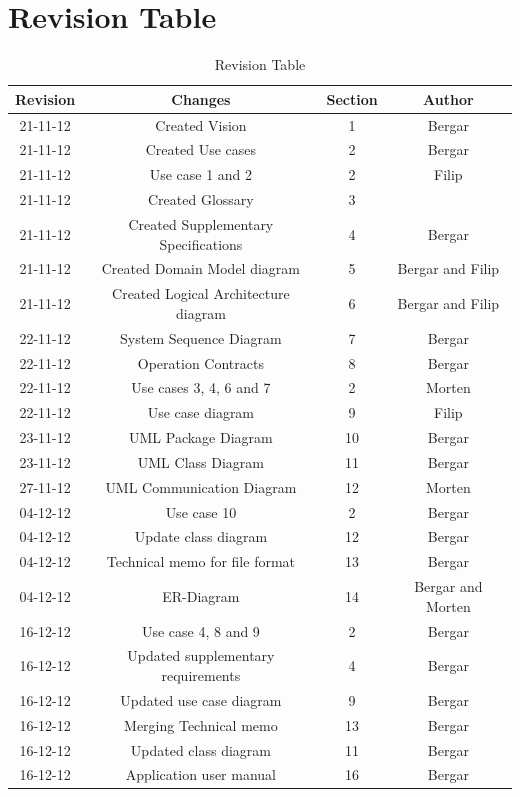 \documentclass[11pt,a4paper]{article}
\begin{document}
\section{Revision Table}
\begin{table}[h]
\caption{Revision Table}
\begin{center}
\begin{tabular}{c|c|c|c}
\hline 
Revision & Changes & Section & Author \\ \hline 
21-11-12 & Created Vision & 1 & Bergar \\ 
21-11-12 & Created Use cases & 2 & Bergar \\
21-11-12 & Use case 1 and 2 & 2 & Filip \\
21-11-12 & Created Glossary & 3 & \\
21-11-12 & Created Supplementary Specifications & 4 & Bergar \\ 
21-11-12 & Created Domain Model diagram & 5 & Bergar and Filip \\
21-11-12 & Created Logical Architecture diagram & 6 & Bergar and Filip \\
\hline 
22-11-12 & System Sequence Diagram & 7 & Bergar \\
22-11-12 & Operation Contracts & 8 & Bergar \\
22-11-12 & Use cases 3, 4, 6 and 7 & 2 & Morten \\
22-11-12 & Use case diagram & 9 & Filip \\
\hline
23-11-12 & UML Package Diagram & 10 & Bergar \\
23-11-12 & UML Class Diagram & 11 & Bergar \\
\hline
27-11-12 & UML Communication Diagram & 12 & Morten \\
\hline
04-12-12 & Use case 10 & 2 & Bergar \\
04-12-12 & Update class diagram & 12 & Bergar \\
04-12-12 & Technical memo for file format & 13 & Bergar \\
04-12-12 & ER-Diagram & 14 & Bergar and Morten  \\
\hline
16-12-12 & Use case 4, 8 and 9 & 2 & Bergar \\
16-12-12 & Updated supplementary requirements & 4 & Bergar \\
16-12-12 & Updated use case diagram & 9 & Bergar \\
16-12-12 & Merging Technical memo & 13 & Bergar \\
16-12-12 & Updated class diagram & 11 & Bergar \\
16-12-12 & Application user manual & 16 & Bergar \\
\hline
\end{tabular} 
\end{center}
\end{table}
	
\end{document}
